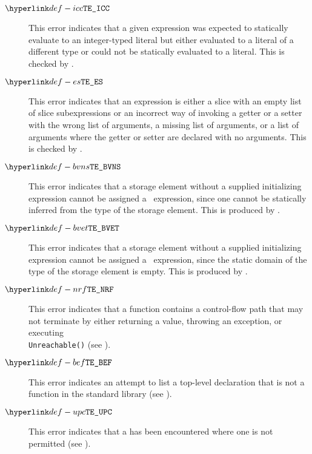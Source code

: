 \begin{description}
\hypertarget{def-icc}{}
\item[$\IntConstantExpected$]
This error indicates that a given expression was expected to statically evaluate
to an integer-typed literal but either evaluated to a literal of a different type
or could not be statically evaluated to a literal.
This is checked by .

\hypertarget{def-es}{}
\item[$\EmptySlice$]
This error indicates that an expression is either a slice with an empty list of slice subexpressions
or an incorrect way of invoking a getter or a setter with the wrong list of arguments, a missing
list of arguments, or a list of arguments where the getter or setter are declared with no arguments.
This is checked by .

\hypertarget{def-bvns}{}
\item[$\BaseValueNonStatic$]
This error indicates that a storage element without a supplied initializing expression cannot be
assigned a \basevalueterm\ expression, since one cannot be statically inferred from the type of the
storage element.
This is produced by .

\hypertarget{def-bvet}{}
\item[$\BaseValueEmptyType$]
This error indicates that a storage element without a supplied initializing expression cannot be
assigned a \basevalueterm\ expression, since the static domain of the type of the storage element
is empty.
This is produced by .

\hypertarget{def-nrf}{}
\item[$\NonReturningFunction$]
This error indicates that a function contains a control-flow path that may not terminate by
either returning a value, throwing an exception, or executing \\
\texttt{Unreachable()} (see ).

\hypertarget{def-bef}{}
\item[$\BuiltinExpectedToBeFunction$]
This error indicates an attempt to list a top-level declaration that is not a function
in the standard library
(see ).

\hypertarget{def-upc}{}
\item[$\UnexpectedPendingConstrained$]
This error indicates that a \pendingconstrainedintegertype{} has been encountered where one is not permitted
(see ).


\end{description}
